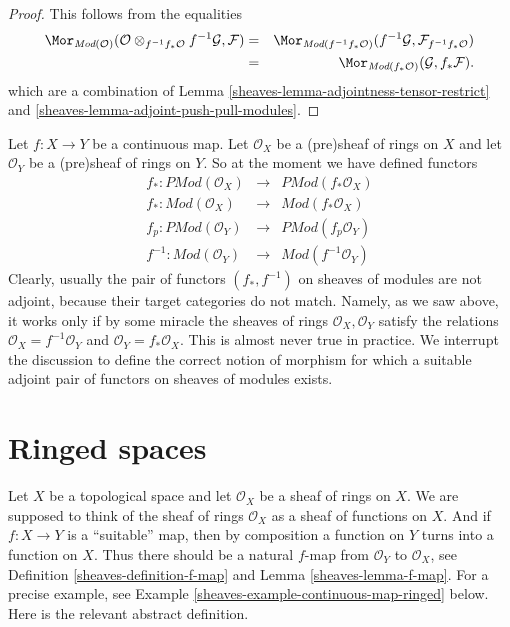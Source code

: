 \begin{proof}

This follows from the equalities
\begin{eqnarray*}
\Mor_{\textit{Mod}(\mathcal{O})}(
\mathcal{O} \otimes_{f^{-1}f_*\mathcal{O}} f^{-1}\mathcal{G}, \mathcal{F})
& = &
\Mor_{\textit{Mod}(f^{-1}f_*\mathcal{O})}(
f^{-1}\mathcal{G}, \mathcal{F}_{f^{-1}f_*\mathcal{O}}) \\
& = &
\Mor_{\textit{Mod}(f_*\mathcal{O})}(\mathcal{G}, f_*\mathcal{F}).
\end{eqnarray*}
which are a combination of
Lemma \ref{sheaves-lemma-adjointness-tensor-restrict}
and \ref{sheaves-lemma-adjoint-push-pull-modules}.
\end{proof}

Let $f : X \to Y$ be a continuous map.
Let $\mathcal{O}_X$ be a (pre)sheaf of rings on $X$ and
let $\mathcal{O}_Y$ be a (pre)sheaf of rings on $Y$.
So at the moment we have defined functors
\begin{eqnarray*}
f_* : \textit{PMod}(\mathcal{O}_X) &
\longrightarrow &
\textit{PMod}(f_*\mathcal{O}_X) \\
f_* : \textit{Mod}(\mathcal{O}_X) &
\longrightarrow &
\textit{Mod}(f_*\mathcal{O}_X) \\
f_p : \textit{PMod}(\mathcal{O}_Y) &
\longrightarrow &
\textit{PMod}(f_p\mathcal{O}_Y) \\
f^{-1} : \textit{Mod}(\mathcal{O}_Y) &
\longrightarrow &
\textit{Mod}(f^{-1}\mathcal{O}_Y)
\end{eqnarray*}
Clearly, usually the pair of functors $(f_*, f^{-1})$
on sheaves of modules are not adjoint, because their target categories
do not match. Namely, as we saw above, it works only if by some miracle the
sheaves of rings $\mathcal{O}_X, \mathcal{O}_Y$ satisfy the
relations $\mathcal{O}_X = f^{-1}\mathcal{O}_Y$ and
$\mathcal{O}_Y = f_*\mathcal{O}_X$. This is almost never
true in practice. We interrupt the discussion to define
the correct notion of morphism for which a suitable adjoint
pair of functors on sheaves of modules exists.

\section{Ringed spaces}
\label{sheaves-section-ringed-spaces}
Let $X$ be a topological space and let $\mathcal{O}_X$
be a sheaf of rings on $X$. We are supposed to
think of the sheaf of rings $\mathcal{O}_X$ as a sheaf of functions
on $X$. And if $f : X \to Y$ is a ``suitable'' map, then by composition
a function on $Y$ turns into a function on $X$.
Thus there should be a natural
$f$-map from $\mathcal{O}_Y$ to $\mathcal{O}_X$,
see Definition \ref{sheaves-definition-f-map} and
Lemma \ref{sheaves-lemma-f-map}.
For a precise example, see
Example \ref{sheaves-example-continuous-map-ringed} below. Here is the
relevant abstract definition.

